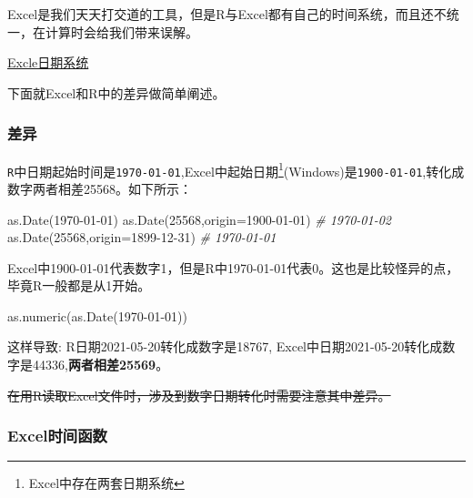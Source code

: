 \documentclass[
]{book}
\newenvironment{Shaded}{\begin{snugshade}}{\end{snugshade}}
\newcommand{\AttributeTok}[1]{\textcolor[rgb]{0.77,0.63,0.00}{#1}}
\newcommand{\CommentTok}[1]{\textcolor[rgb]{0.56,0.35,0.01}{\textit{#1}}}
\newcommand{\DecValTok}[1]{\textcolor[rgb]{0.00,0.00,0.81}{#1}}
\newcommand{\FunctionTok}[1]{\textcolor[rgb]{0.00,0.00,0.00}{#1}}
\newcommand{\NormalTok}[1]{#1}
\newcommand{\StringTok}[1]{\textcolor[rgb]{0.31,0.60,0.02}{#1}}
\begin{document}
Excel是我们天天打交道的工具，但是R与Excel都有自己的时间系统，而且还不统一，在计算时会给我们带来误解。

\href{https://support.microsoft.com/zh-cn/office/excel-\%e4\%b8\%ad\%e7\%9a\%84\%e6\%97\%a5\%e6\%9c\%9f\%e7\%b3\%bb\%e7\%bb\%9f-e7fe7167-48a9-4b96-bb53-5612a800b487?ui=zh-CN\&rs=zh-CN\&ad=CN}{Excle日期系统}

下面就Excel和R中的差异做简单阐述。

\hypertarget{ux5deeux5f02}{%
\subsubsection{差异}\label{ux5deeux5f02}}

\texttt{R}中日期起始时间是\texttt{1970-01-01},Excel中起始日期\footnote{Excel中存在两套日期系统}(Windows)是\texttt{1900-01-01},转化成数字两者相差25568。如下所示：

\begin{Shaded}
\begin{Highlighting}[]
\FunctionTok{as.Date}\NormalTok{(}\StringTok{\textquotesingle{}1970{-}01{-}01\textquotesingle{}}\NormalTok{)}
\FunctionTok{as.Date}\NormalTok{(}\DecValTok{25568}\NormalTok{,}\AttributeTok{origin=}\StringTok{\textquotesingle{}1900{-}01{-}01\textquotesingle{}}\NormalTok{) }\CommentTok{\# 1970{-}01{-}02}
\FunctionTok{as.Date}\NormalTok{(}\DecValTok{25568}\NormalTok{,}\AttributeTok{origin=}\StringTok{\textquotesingle{}1899{-}12{-}31\textquotesingle{}}\NormalTok{) }\CommentTok{\# 1970{-}01{-}01}
\end{Highlighting}
\end{Shaded}

Excel中1900-01-01代表数字1，但是R中1970-01-01代表0。这也是比较怪异的点，毕竟R一般都是从1开始。

\begin{Shaded}
\begin{Highlighting}[]
\FunctionTok{as.numeric}\NormalTok{(}\FunctionTok{as.Date}\NormalTok{(}\StringTok{\textquotesingle{}1970{-}01{-}01\textquotesingle{}}\NormalTok{))}
\end{Highlighting}
\end{Shaded}

这样导致:
R日期2021-05-20转化成数字是18767,
Excel中日期2021-05-20转化成数字是44336,\textbf{两者相差25569}。

\sout{在用R读取Excel文件时，涉及到数字日期转化时需要注意其中差异。}

\hypertarget{excelux65f6ux95f4ux51fdux6570}{%
\subsubsection{Excel时间函数}\label{excelux65f6ux95f4ux51fdux6570}}
\end{document}
